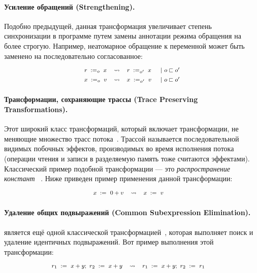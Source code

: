 \paragraph{
Усиление обращений
(Strengthening).
}

Подобно предыдущей, данная трансформация 
увеличивает степень синхронизации в программе 
путем замены аннотации режима обращения на более строгую.
Например, неатомарное обращение к переменной  может быть заменено на 
последовательно согласованное: 
%
\[\def\arraystretch{1.4}\footnotesize
  \begin{array}{cccl} 

      \readInst{o}{r}{x} 
    & \leadsto 
    & \readInst{o'}{r}{x}
    & ~|~ o \sqsubset o' \\ 

      \writeInst{o}{x}{v}
    & \leadsto 
    & \writeInst{o'}{x}{v}
    & ~|~ o \sqsubset o'  \\ 

  \end{array}
\]

\paragraph{
Трансформации, сохраняющие трассы
(Trace Preserving Transformations).
}

Этот широкий класс трансформаций, который включает трансформации, 
не меняющие множество трасс потока~\cite{Sevcik-Aspinall:ECOOP08}.
Трассой называется последовательной видимых побочных эффектов,
производимых во время исполнения потока 
(операции чтения и записи в разделяемую память тоже считаются эффектами).
Классический пример подобной трансформации --- это \emph{распространение констант}%
~\cite{Muchnick:ACDI97, Wegman-Zadeck:TOPLAS91}.
Ниже приведен пример применения данной трансформации: 
%
\[\def\arraystretch{1.4}\footnotesize
  \begin{array}{cccl} 

      \writeInst{}{x}{0 + v} 
    & \leadsto 
    & \writeInst{}{x}{v}
    & \\ 

  \end{array}
\]
  
\paragraph{
Удаление общих подвыражений
(Common Subexpression Elimination).
}

\CSE является ещё одной классической трансформацией~\cite{Muchnick:ACDI97}, 
которая выполняет поиск и удаление идентичных подвыражений.
Вот пример выполнения этой трансформации:
%
\[\def\arraystretch{1.4}\footnotesize
  \begin{array}{cccl} 

      \readInst{}{r_1}{x + y} \seq \readInst{}{r_2}{x + y} 
    & \leadsto 
    & \readInst{}{r_1}{x + y} \seq \readInst{}{r_2}{r_1}
    & \\ 

  \end{array}
\]

